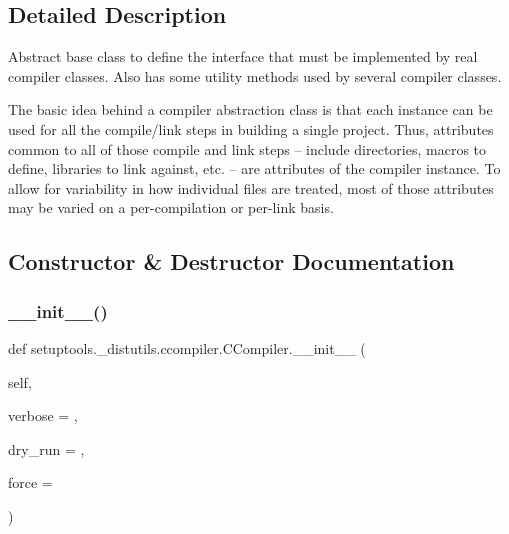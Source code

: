 \subsection{Detailed Description}
\begin{DoxyVerb}Abstract base class to define the interface that must be implemented
by real compiler classes.  Also has some utility methods used by
several compiler classes.

The basic idea behind a compiler abstraction class is that each
instance can be used for all the compile/link steps in building a
single project.  Thus, attributes common to all of those compile and
link steps -- include directories, macros to define, libraries to link
against, etc. -- are attributes of the compiler instance.  To allow for
variability in how individual files are treated, most of those
attributes may be varied on a per-compilation or per-link basis.
\end{DoxyVerb}
 

\subsection{Constructor \& Destructor Documentation}
\mbox{\label{classsetuptools_1_1__distutils_1_1ccompiler_1_1CCompiler_afe74a8de186dbca0fcea104a0d990ce8}} 
\subsubsection{\texorpdfstring{\+\_\+\+\_\+init\+\_\+\+\_\+()}{\_\_init\_\_()}}
{\footnotesize\ttfamily def setuptools.\+\_\+distutils.\+ccompiler.\+C\+Compiler.\+\_\+\+\_\+init\+\_\+\+\_\+ (\begin{DoxyParamCaption}\item[{}]{self,  }\item[{}]{verbose = {},  }\item[{}]{dry\+\_\+run = {},  }\item[{}]{force = {} }\end{DoxyParamCaption})}



